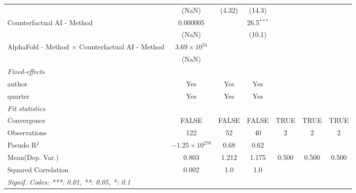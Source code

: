 \begin{tabular}{lcccccc}
                                                           & (NaN)                   & (4.32)       & (14.3)        &      &      &   \\   
   Counterfactual AI - Method                              & 0.000005                &              & 26.5$^{***}$  &      &      &   \\   
                                                           & (NaN)                   &              & (10.1)        &      &      &   \\   
   AlphaFold - Method $\times$ Counterfactual AI - Method  & $3.69\times 10^{24}$    &              &               &      &      &   \\   
                                                           & (NaN)                   &              &               &      &      &   \\   
   \midrule
   \emph{Fixed-effects}\\
   author                                                  & Yes                     & Yes          & Yes           &      &      & \\  
   quarter                                                 & Yes                     & Yes          & Yes           &      &      & \\  
   \midrule
   \emph{Fit statistics}\\
   Convergence                                             &FALSE                    & FALSE        & FALSE         & TRUE & TRUE & TRUE\\  
   Observations                                            & 122                     & 52           & 40            & 2    & 2    & 2\\  
   Pseudo R$^2$                                            & $-1.25\times 10^{276}$  & 0.68         & 0.62          &      &      & \\  
Mean(Dep. Var.) & 0.803 & 1.212 & 1.175 & 0.500 & 0.500 & 0.500 \\
   Squared Correlation                                     & 0.002                   & 1.0          & 1.0           &      &      & \\  
   \midrule \midrule
   \multicolumn{7}{l}{\emph{Signif. Codes: ***: 0.01, **: 0.05, *: 0.1}}\\
\end{tabular}
\par\endgroup
